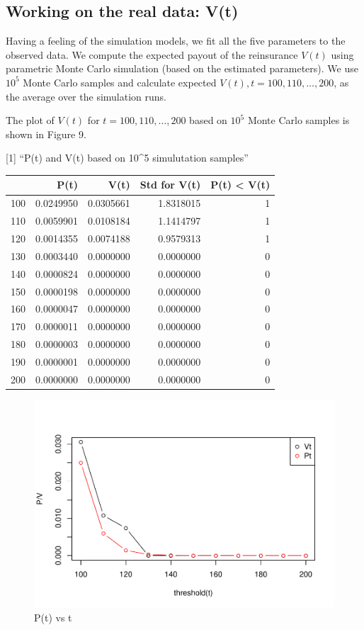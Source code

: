 \documentclass[11pt,]{article}
\begin{document}
\hypertarget{working-on-the-real-data-vt}{%
\subsection{Working on the real data:
V(t)}\label{working-on-the-real-data-vt}}

Having a feeling of the simulation models, we fit all the five
parameters to the observed data. We compute the expected payout of the
reinsurance \(V(t)\) using parametric Monte Carlo simulation (based on
the estimated parameters). We use \(10^5\) Monte Carlo samples and
calculate expected \(V(t), t=100,110,…,200\), as the average over the
simulation runs.

The plot of \(V(t)\) for \(t=100,110,…,200\) based on \(10^5\) Monte
Carlo samples is shown in Figure 9.

{[}1{]} ``P(t) and V(t) based on 10\^{}5 simulutation samples''

\begin{longtable}[]{@{}lrrrr@{}}
\toprule
& P(t) & V(t) & Std for V(t) & P(t) \textless{} V(t)\tabularnewline
\midrule
\endhead
100 & 0.0249950 & 0.0305661 & 1.8318015 & 1\tabularnewline
110 & 0.0059901 & 0.0108184 & 1.1414797 & 1\tabularnewline
120 & 0.0014355 & 0.0074188 & 0.9579313 & 1\tabularnewline
130 & 0.0003440 & 0.0000000 & 0.0000000 & 0\tabularnewline
140 & 0.0000824 & 0.0000000 & 0.0000000 & 0\tabularnewline
150 & 0.0000198 & 0.0000000 & 0.0000000 & 0\tabularnewline
160 & 0.0000047 & 0.0000000 & 0.0000000 & 0\tabularnewline
170 & 0.0000011 & 0.0000000 & 0.0000000 & 0\tabularnewline
180 & 0.0000003 & 0.0000000 & 0.0000000 & 0\tabularnewline
190 & 0.0000001 & 0.0000000 & 0.0000000 & 0\tabularnewline
200 & 0.0000000 & 0.0000000 & 0.0000000 & 0\tabularnewline
\bottomrule
\end{longtable}

\begin{figure}
\centering
\includegraphics{figs/unnamed-chunk-20.pdf}
\caption{P(t) vs t}
\end{figure}
\end{document}
